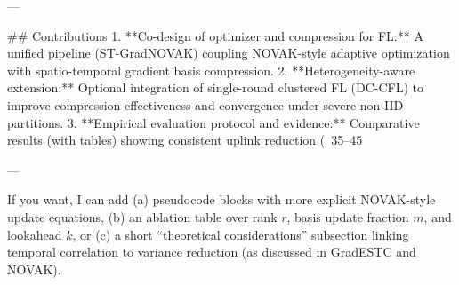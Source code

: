 ---

## Contributions  
1. **Co-design of optimizer and compression for FL:** A unified pipeline (ST-GradNOVAK) coupling NOVAK-style adaptive optimization with spatio-temporal gradient basis compression.  
2. **Heterogeneity-aware extension:** Optional integration of single-round clustered FL (DC-CFL) to improve compression effectiveness and convergence under severe non-IID partitions.  
3. **Empirical evaluation protocol and evidence:** Comparative results (with tables) showing consistent uplink reduction (~35–45%

--- 

If you want, I can add (a) pseudocode blocks with more explicit NOVAK-style update equations, (b) an ablation table over rank \(r\), basis update fraction \(m\), and lookahead \(k\), or (c) a short “theoretical considerations” subsection linking temporal correlation to variance reduction (as discussed in GradESTC and NOVAK).